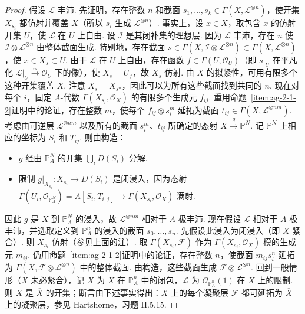 \begin{proof}
假设 $\mathcal L$ 丰沛. 先证明，存在整数 $n$ 和截面 $s_1,\ldots,s_k\in\Gamma(X,\mathcal L^{\otimes n})$，使开集 $X_{s_i}$ 都仿射并覆盖 $X$（所以 $s_i$ 生成 $\mathcal L^{\otimes n}$）. 事实上，设 $x\in X$，取包含 $x$ 的仿射开集 $U$，使 $\mathcal L$ 在 $U$ 上自由. 设 $\mathcal I$ 是其闭补集的理想层. 因为 $\mathcal L$ 丰沛，存在 $n$ 使 $\mathcal I\otimes\mathcal L^{\otimes n}$ 由整体截面生成. 特别地，存在截面 $s\in\Gamma(X,\mathcal I\otimes\mathcal L^{\otimes n})\subset\Gamma(X,\mathcal L^{\otimes n})$，使 $x\in X_s\subset U$. 由于 $\mathcal L$ 在 $U$ 上自由，存在函数 $f\in\Gamma(U,\mathcal O_U)$（即 $s|_U$ 在平凡化 $\mathcal L|_U\xrightarrow\sim\mathcal O_U$ 下的像），使 $X_s=U_f$，故 $X_s$ 仿射. 由 $X$ 的拟紧性，可用有限多个这种开集覆盖 $X$. 注意 $X_s=X_{s^n}$，因此可以为所有这些截面找到共同的 $n$.
现在对每个 $i$，固定 $A$-代数 $\Gamma(X_{s_i},\mathcal O_X)$ 的有限多个生成元 $f_{ij}$. 重用命题~\ref{item:ag-2-1-2}证明中的论证，存在整数 $m$，使每个 $f_{ij}\otimes s_i^m$ 延拓为截面 $t_{ij}\in\Gamma(X,\mathcal L^{\otimes nm})$. 考虑由可逆层 $\mathcal L^{\otimes nm}$ 以及所有的截面 $s_i^m$、$t_{ij}$ 所确定的态射 $X\xrightarrow g\mathbb P^N$. 记 $\mathbb P^N$ 上相应的坐标为 $S_i$ 和 $T_{ij}$. 则由构造：
\begin{itemize}
\item $g$ 经由 $\mathbb P_A^N$ 的开集 $\bigcup_iD(S_i)$ 分解.
\item 限制 $g|_{X_{s_i}}:X_{s_i}\longrightarrow D(S_i)$ 是闭浸入，因为态射 $\Gamma(U_i,\mathcal O_{\mathbb P_A^N})=A[S_i,T_{i,j}]\longrightarrow\Gamma(X_{s_i},\mathcal O_X)$ 满射.
\end{itemize}
因此 $g$ 是 $X$ 到 $\mathbb P_A^N$ 的浸入，故 $\mathcal L^{\otimes nm}$ 相对于 $A$ 极丰沛.
现在假设 $\mathcal L$ 相对于 $A$ 极丰沛，并选取定义到 $\mathbb P_A^n$ 的浸入的截面 $s_0,\ldots,s_n$. 先假设此浸入为闭浸入（即 $X$ 紧合）. 则 $X_{s_i}$ 仿射（参见上面的注）. 取 $\Gamma(X_{s_i},\mathcal F)$ 作为 $\Gamma(X_{s_i},\mathcal O_X)$-模的生成元 $m_{ij}$. 仍用命题~\ref{item:ag-2-1-2}证明中的论证，存在整数 $n$，使截面 $m_{ij}s_i^n$ 延拓为 $\Gamma(X,\mathcal F\otimes\mathcal L^{\otimes n})$ 中的整体截面. 由构造，这些截面生成 $\mathcal F\otimes\mathcal L^{\otimes n}$. 回到一般情形（$X$ 未必紧合），记 $\overline X$ 为 $X$ 在 $\mathbb P_A^n$ 中的闭包，$\overline{\mathcal L}$ 为 $\mathcal O_{\mathbb P_A^n}(1)$ 在 $\overline X$ 上的限制. 则 $X$ 是 $\overline X$ 的开集；断言由下述事实得出：$X$ 上的每个凝聚层 $\mathcal F$ 都可延拓为 $\overline X$ 上的凝聚层，参见 Hartshorne，习题 II.5.15.
\end{proof}

